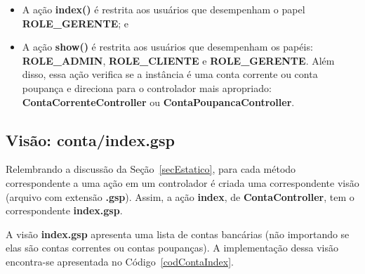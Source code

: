\begin{itemize}

\item A ação {\bf index()} é  restrita aos usuários que desempenham o papel {\bf
  ROLE\_GERENTE}; e 

\vspace{0,3cm}

\item A  ação {\bf show()}  é restrita aos  usuários que desempenham  os papéis:
  {\bf ROLE\_ADMIN}, {\bf ROLE\_CLIENTE} e {\bf ROLE\_GERENTE}. Além disso, essa
  ação  verifica  se a  instância  é  uma conta  corrente  ou  conta poupança  e
  direciona para o controlador mais apropriado: {\bf ContaCorrenteController} ou
  {\bf ContaPoupancaController}.  

\end{itemize}

\subsection{Visão: conta/index.gsp}

\vspace{0.5cm}

Relembrando   a   discussão  da   Seção~\ref{secEstatico},   para  cada   método
correspondente a  uma ação em um  controlador é criada  uma correspondente visão
(arquivo  com  extensão  {\bf  .gsp}).  Assim,  a  ação  {\bf  index},  de  {\bf
  ContaController}, tem o correspondente {\bf index.gsp}.  

\vspace{0.2cm}

A visão {\bf index.gsp} apresenta  uma lista de contas bancárias (não importando
se elas são  contas correntes ou contas poupanças).  A implementação dessa visão
encontra-se apresentada no Código~\ref{codContaIndex}. 

\vspace{0.3cm}

